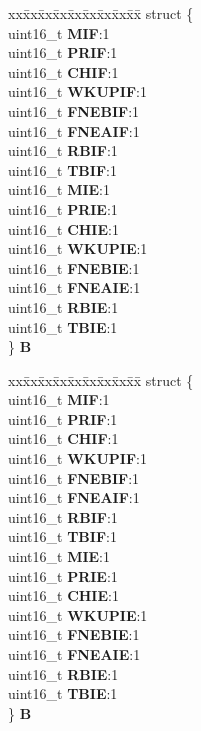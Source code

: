 \begin{DoxyCompactItemize}
\begin{tabbing}
\end{tabbing}\item 
\mbox{\label{unionuGIFER_ad4c1dce7330d8efea0536d2391f523d0}} 
\begin{tabbing}
xx\=xx\=xx\=xx\=xx\=xx\=xx\=xx\=xx\=\kill
struct \{\\
\>uint16\_t {\bfseries MIF}:1\\
\>uint16\_t {\bfseries PRIF}:1\\
\>uint16\_t {\bfseries CHIF}:1\\
\>uint16\_t {\bfseries WKUPIF}:1\\
\>uint16\_t {\bfseries FNEBIF}:1\\
\>uint16\_t {\bfseries FNEAIF}:1\\
\>uint16\_t {\bfseries RBIF}:1\\
\>uint16\_t {\bfseries TBIF}:1\\
\>uint16\_t {\bfseries MIE}:1\\
\>uint16\_t {\bfseries PRIE}:1\\
\>uint16\_t {\bfseries CHIE}:1\\
\>uint16\_t {\bfseries WKUPIE}:1\\
\>uint16\_t {\bfseries FNEBIE}:1\\
\>uint16\_t {\bfseries FNEAIE}:1\\
\>uint16\_t {\bfseries RBIE}:1\\
\>uint16\_t {\bfseries TBIE}:1\\
\} {\bfseries B}\\

\end{tabbing}\item 
\mbox{\label{unionuGIFER_a35e4805ed0b3157f22b631591cc46d3e}} 
\begin{tabbing}
xx\=xx\=xx\=xx\=xx\=xx\=xx\=xx\=xx\=\kill
struct \{\\
\>uint16\_t {\bfseries MIF}:1\\
\>uint16\_t {\bfseries PRIF}:1\\
\>uint16\_t {\bfseries CHIF}:1\\
\>uint16\_t {\bfseries WKUPIF}:1\\
\>uint16\_t {\bfseries FNEBIF}:1\\
\>uint16\_t {\bfseries FNEAIF}:1\\
\>uint16\_t {\bfseries RBIF}:1\\
\>uint16\_t {\bfseries TBIF}:1\\
\>uint16\_t {\bfseries MIE}:1\\
\>uint16\_t {\bfseries PRIE}:1\\
\>uint16\_t {\bfseries CHIE}:1\\
\>uint16\_t {\bfseries WKUPIE}:1\\
\>uint16\_t {\bfseries FNEBIE}:1\\
\>uint16\_t {\bfseries FNEAIE}:1\\
\>uint16\_t {\bfseries RBIE}:1\\
\>uint16\_t {\bfseries TBIE}:1\\
\} {\bfseries B}\\


\end{tabbing}
\end{DoxyCompactItemize}
